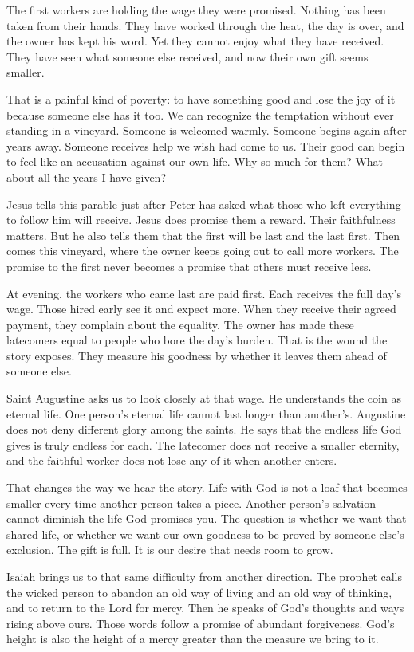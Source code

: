 The first workers are holding the wage they were promised. Nothing has been taken from their hands. They have worked through the heat, the day is over, and the owner has kept his word. Yet they cannot enjoy what they have received. They have seen what someone else received, and now their own gift seems smaller.

That is a painful kind of poverty: to have something good and lose the joy of it because someone else has it too. We can recognize the temptation without ever standing in a vineyard. Someone is welcomed warmly. Someone begins again after years away. Someone receives help we wish had come to us. Their good can begin to feel like an accusation against our own life. Why so much for them? What about all the years I have given?

Jesus tells this parable just after Peter has asked what those who left everything to follow him will receive. Jesus does promise them a reward. Their faithfulness matters. But he also tells them that the first will be last and the last first. Then comes this vineyard, where the owner keeps going out to call more workers. The promise to the first never becomes a promise that others must receive less.

At evening, the workers who came last are paid first. Each receives the full day's wage. Those hired early see it and expect more. When they receive their agreed payment, they complain about the equality. The owner has made these latecomers equal to people who bore the day's burden. That is the wound the story exposes. They measure his goodness by whether it leaves them ahead of someone else.

Saint Augustine asks us to look closely at that wage. He understands the coin as eternal life. One person's eternal life cannot last longer than another's. Augustine does not deny different glory among the saints. He says that the endless life God gives is truly endless for each. The latecomer does not receive a smaller eternity, and the faithful worker does not lose any of it when another enters.

That changes the way we hear the story. Life with God is not a loaf that becomes smaller every time another person takes a piece. Another person's salvation cannot diminish the life God promises you. The question is whether we want that shared life, or whether we want our own goodness to be proved by someone else's exclusion. The gift is full. It is our desire that needs room to grow.

Isaiah brings us to that same difficulty from another direction. The prophet calls the wicked person to abandon an old way of living and an old way of thinking, and to return to the Lord for mercy. Then he speaks of God's thoughts and ways rising above ours. Those words follow a promise of abundant forgiveness. God's height is also the height of a mercy greater than the measure we bring to it.


